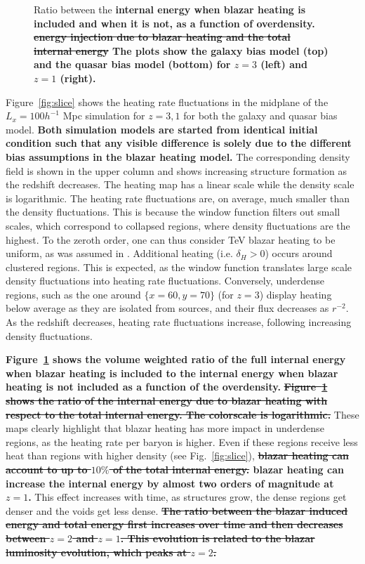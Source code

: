 \documentclass[twocolumns]{emulateapj}
\newcommand\ALc[1]{{\color{red} \bf #1}} %
\newcommand\Cc[1]{{\color{blue} \bf #1}} %
\begin{document}
\begin{figure}
\caption{Ratio between the \ALc{internal energy when blazar heating is included and when it is not, as a function of overdensity. \sout{energy injection due to blazar heating and the total internal energy} The plots show the galaxy bias model (top) and the quasar bias model (bottom) for $z=3$ (left) and $z=1$ (right).}}
\label{fig:heating_ratio}
\end{figure}
Figure~\ref{fig:slice} shows the heating rate fluctuations in the midplane of the $L_x=100h^{-1}$ Mpc simulation for $z=3,1$ for both the galaxy and quasar bias model. \Cc{Both simulation models are started from identical initial condition such that any visible difference is solely due to the different bias assumptions in the blazar heating model.} The corresponding density field is shown in the upper column and shows increasing structure formation as the redshift decreases. The heating map has a linear scale while the density scale is logarithmic. The heating rate fluctuations are, on average, much smaller than the density fluctuations. This is because the window function filters out small scales, which correspond to collapsed regions, where density fluctuations are the highest. To the zeroth order, one can thus consider TeV blazar heating to be uniform, as was assumed in \citet{2012ApJ...752...23C}.
Additional heating (i.e. $\delta_H>0$) occurs around clustered regions. This is expected, as the window function translates large scale density fluctuations into heating rate fluctuations. Conversely, underdense regions, such as the one around $\{x=60,y=70\}$ (for $z=3$) display heating below average as they are isolated from sources, and their flux decreases as $r^{-2}$. As the redshift decreases, heating rate fluctuations increase, following increasing density fluctuations.

\ALc{Figure~\ref{fig:heating_ratio} shows the volume weighted ratio of the full internal energy when blazar heating is included to the internal energy when blazar heating is not included as a function of the overdensity.} \ALc{\sout{ Figure~\ref{fig:heating_ratio} shows the ratio of the internal energy due to blazar heating with respect to the total internal energy. The colorscale is logarithmic.}} These maps clearly highlight that blazar heating has more impact in underdense regions, as the heating rate per baryon is higher. Even if these regions receive less heat than regions with higher density (see Fig.~\ref{fig:slice}), \ALc{ \sout{blazar heating can account to up to $10\%$ of the total internal energy.} blazar heating can increase the internal energy by almost two orders of magnitude at $z=1$.} This effect increases with time, as structures grow, the dense regions get denser and the voids get less dense. \ALc{\sout{The ratio between the blazar induced energy and total energy first increases over time and then decreases between $z=2$ and $z=1$. This evolution is related to the blazar luminosity evolution, which peaks at $z=2$.}}
\end{document}
